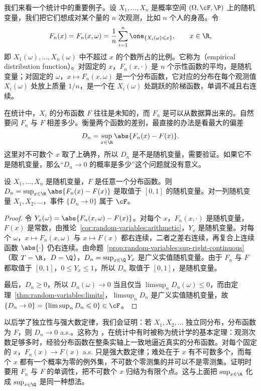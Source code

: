 我们来看一个统计中的重要例子。设 $X_1,\dots,X_n$ 是概率空间 $(\Omega,\cF,\P)$ 上的随机变量，我们把它们想成对某个量的 $n$ 次观测，比如 $n$ 个人的身高。令
\[
F_n(x)=F_n(x,\omega)=\frac1n\sum_{i=1}^n\one_{\{X_i(\omega)\leqslant x\}},\qquad x\in\R,
\]
即 $X_1(\omega),\dots,X_n(\omega)$ 中不超过 $x$ 的个数所占的比例。它称为（empirical distribution function）。对固定的 $x$，$F_n(x,\cdot)$ 是 $n$ 个示性函数的平均，是随机变量；对固定的 $\omega$，$x\mapsto F_n(x,\omega)$ 是一个分布函数，它对应的分布在每个观测值 $X_i(\omega)$ 处放上质量 $1/n$，是一个在 $X_i(\omega)$ 处跳跃的阶梯函数，单调不减且右连续。

在统计中，$X_i$ 的分布函数 $F$ 往往是未知的，而 $F_n$ 是可以从数据算出来的。自然要问 $F_n$ 与 $F$ 相差多少。衡量两个函数的差别，最直接的办法是看最大的偏差
\[
D_n=\sup_{x\in\R}\abs{F_n(x)-F(x)}.
\]
这里对不可数个 $x$ 取了上确界，所以 $D_n$ 是不是随机变量，需要验证。如果它不是随机变量，那么“$D_n\to0$ 的概率是多少”这个问题就没有意义。

\begin{proposition}\label{prop:random-variables:empirical}
设 $X_1,\dots,X_n$ 是随机变量，$F$ 是任意一个分布函数。则 $D_n=\sup_{x\in\R}\abs{F_n(x)-F(x)}$ 是取值于 $[0,1]$ 的随机变量。对一列随机变量 $X_1,X_2,\dots$，事件 $\{D_n\to0\}$ 属于 $\cF$。
\end{proposition}
\begin{proof}
令 $Y_x(\omega)=\abs{F_n(x,\omega)-F(x)}$。对每个 $x$，$F_n(x,\cdot)$ 是随机变量，$F(x)$ 是常数，由推论~\ref{cor:random-variables:arithmetic}，$Y_x$ 是随机变量。对每个 $\omega$，$x\mapsto F_n(x,\omega)$ 与 $x\mapsto F(x)$ 都右连续，二者之差右连续，再复合上连续函数 $\abs{\cdot}$ 仍右连续。由命题~\ref{prop:random-variables:sup-right-continuous}（取 $T=\R$，$D=\Q$），$D_n=\sup_{x\in\Q}Y_x$ 是广义实值随机变量。由于 $F_n$ 与 $F$ 都取值于 $[0,1]$，$0\leqslant Y_x\leqslant1$，所以 $D_n$ 取值于 $[0,1]$，是随机变量。

最后，$D_n\geqslant0$，所以 $D_n(\omega)\to0$ 当且仅当 $\limsup_nD_n(\omega)\leqslant0$，而由定理~\ref{thm:random-variables:limits}，$\limsup_nD_n$ 是广义实值随机变量，故 $\{D_n\to0\}=\{\limsup_nD_n\leqslant0\}\in\cF$。
\end{proof}

\begin{remark}
以后学了独立性与强大数定律，我们会证明：若 $X_1,X_2,\dots$ 独立同分布，分布函数为 $F$，则 $D_n\to0$ a.s.。这称为 ，在统计中有时被称为统计学的基本定理：观测次数足够多时，经验分布函数在整条实轴上一致地逼近真实的分布函数。对每个固定的 $x$，$F_n(x)\to F(x)$ a.s. 只是强大数定律；难处在于 $x$ 有不可数多个，而每个 $x$ 都有一个概率为零的例外集，不可数个零测集的并可以不是零测集。证明时要用 $F_n$ 与 $F$ 的单调性，把不可数个 $x$ 归结为有限个点。这与上面把 $\sup_{x\in\R}$ 化成 $\sup_{x\in\Q}$ 是同一种想法。
\end{remark}

